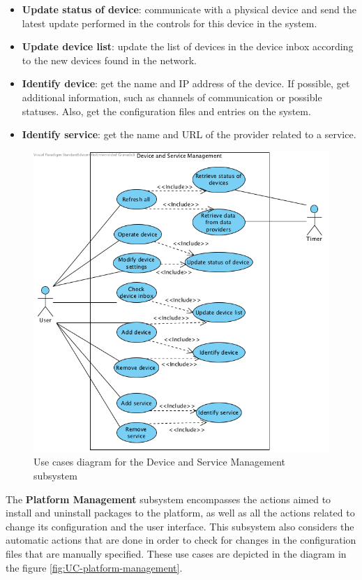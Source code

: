 \begin{itemize}
	\item \textbf{Update status of device}: communicate with a physical device and send the latest update performed in the controls 
	for this device in the system.
	\item \textbf{Update device list}: update the list of devices in the device inbox according to the new devices found in the network.
	\item \textbf{Identify device}: get the name and IP address of the device. If possible, get additional information, such as 
	channels of communication or possible statuses. Also, get the configuration files and entries on the system.
	\item \textbf{Identify service}: get the name and URL of the provider related to a service.
\end{itemize}

\begin{figure}
	\centering
	\includegraphics[width=1\textwidth]{images/Chapter_07/UC-device-and-service-management.png}
	\caption{Use cases diagram for the Device and Service Management subsystem}
	\label{fig:UC-device-and-service-management}
\end{figure}

The \textbf{Platform Management} subsystem encompasses the actions aimed to install and uninstall packages to the platform, as well
as all the actions related to change its configuration and the user interface. This subsystem also considers the automatic actions that
are done in order to check for changes in the configuration files that are manually specified. These use cases are depicted in the diagram
in the figure \ref{fig:UC-platform-management}.

